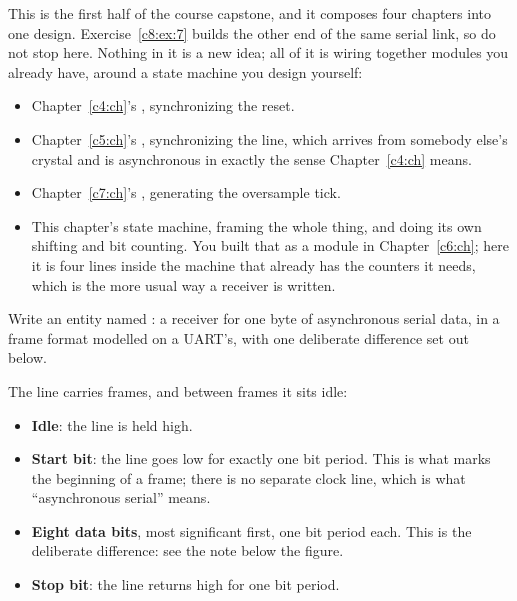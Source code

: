 \label{c8:ex:6}
This is the first half of the course capstone, and it composes four chapters into one design.
Exercise~\ref{c8:ex:7} builds the other end of the same serial link, so do not stop here. Nothing in
it is a new idea; all of it is wiring together modules you already have, around a state machine you
design yourself:
\begin{itemize}
  \item Chapter~\ref{c4:ch}'s , synchronizing the reset.
  \item Chapter~\ref{c5:ch}'s , synchronizing the  line, which arrives from
    somebody else's crystal and is asynchronous in exactly the sense Chapter~\ref{c4:ch} means.
  \item Chapter~\ref{c7:ch}'s , generating the oversample tick.
  \item This chapter's state machine, framing the whole thing, and doing its own shifting and bit
    counting. You built that as a module in Chapter~\ref{c6:ch}; here it is four lines inside the
    machine that already has the counters it needs, which is the more usual way a receiver is
    written.
\end{itemize}
Write an entity named : a receiver for one byte of asynchronous serial data, in a
frame format modelled on a UART's, with one deliberate difference set out below.

The  line carries frames, and between frames it sits idle:
\begin{itemize}
  \item \textbf{Idle}: the line is held high.
  \item \textbf{Start bit}: the line goes low for exactly one bit period. This is what marks the
    beginning of a frame; there is no separate clock line, which is what ``asynchronous serial''
    means.
  \item \textbf{Eight data bits}, most significant first, one bit period each. This is the
    deliberate difference: see the note below the figure.
  \item \textbf{Stop bit}: the line returns high for one bit period.
\end{itemize}


